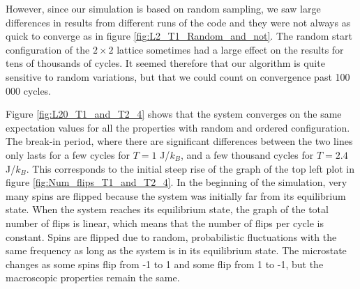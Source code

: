 \documentclass[reprint, english,notitlepage,nofootinbib]{revtex4-1}  %
\begin{document}
However, since our simulation is based on random sampling, we saw large differences in results from different runs of the code and they were not always as quick to converge as in figure \ref{fig:L2_T1_Random_and_not}. The random start configuration of the $2 \times 2$ lattice sometimes had a large effect on the results for tens of thousands of cycles. It seemed therefore that our algorithm is quite sensitive to random variations, but that we could count on convergence past 100 000 cycles.

Figure \ref{fig:L20_T1_and_T2_4} shows that the system converges on the same expectation values for all the properties with random and ordered configuration. The break-in period, where there are significant differences between the two lines only lasts for a few cycles for $T = 1$ J/$k_B$, and a few thousand cycles for $T = 2.4$ J/$k_B$. This corresponds to the initial steep rise of the graph of the top left plot in figure \ref{fig:Num_flips_T1_and_T2_4}. In the beginning of the simulation, very many spins are flipped because the system was initially far from its equilibrium state. When the system reaches its equilibrium state, the graph of the total number of flips is linear, which means that the number of flips per cycle is constant. Spins are flipped due to random, probabilistic fluctuations with the same frequency as long as the system is in its equilibrium state. The microstate changes as some spins flip from -1 to 1 and some flip from 1 to -1, but the macroscopic properties remain the same.
\end{document}
